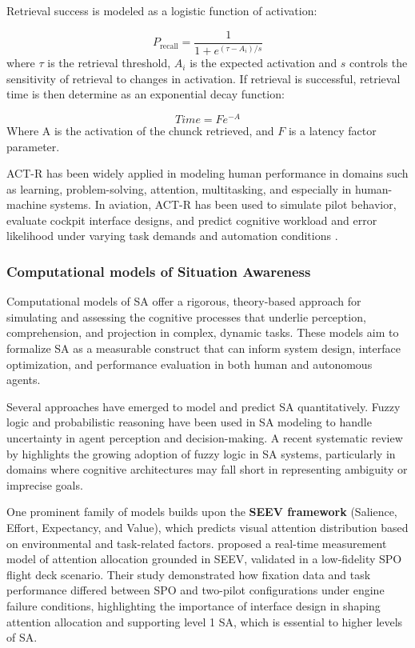 \documentclass[12pt,a4paper]{article} %
\begin{document}
	Retrieval success is modeled as a logistic function of activation:

	\begin{equation}
	P_{\text{recall}} = \frac{1}{1 + e^{(\tau - A_i)/s}}
	\end{equation}
	where $\tau$ is the retrieval threshold, $A_i$ is the expected activation and $s$ controls the sensitivity of retrieval to changes in activation. If retrieval is successful, retrieval time is then determine as an exponential decay function:

	\begin{equation}
	Time = F e^{-A}
	\end{equation}
	Where A is the activation of the chunck retrieved, and $F$ is a latency factor parameter.

	ACT-R has been widely applied in modeling human performance in domains such as learning, problem-solving, attention, multitasking, and especially in human-machine systems. In aviation, ACT-R has been used to simulate pilot behavior, evaluate cockpit interface designs, and predict cognitive workload and error likelihood under varying task demands and automation conditions \parencite{klaproth_modeling_2024,xu_modeling_2021,foyle_human_2005}.

	\subsubsection{Computational models of Situation Awareness}

	Computational models of SA offer a rigorous, theory-based approach for simulating and assessing the cognitive processes that underlie perception, comprehension, and projection in complex, dynamic tasks. These models aim to formalize SA as a measurable construct that can inform system design, interface optimization, and performance evaluation in both human and autonomous agents.

	Several approaches have emerged to model and predict SA quantitatively. Fuzzy logic and probabilistic reasoning have been used in SA modeling to handle uncertainty in agent perception and decision-making. A recent systematic review by \textcite{daniello_fuzzy_2023} highlights the growing adoption of fuzzy logic in SA systems, particularly in domains where cognitive architectures may fall short in representing ambiguity or imprecise goals.
	
	One prominent family of models builds upon the \textbf{SEEV framework} (Salience, Effort, Expectancy, and Value), which predicts visual attention distribution based on environmental and task-related factors. \textcite{wang_real-time_2024} proposed a real-time measurement model of attention allocation grounded in SEEV, validated in a low-fidelity SPO flight deck scenario. Their study demonstrated how fixation data and task performance differed between SPO and two-pilot configurations under engine failure conditions, highlighting the importance of interface design in shaping attention allocation and supporting level 1 SA, which is essential to higher levels of SA.
\end{document}
